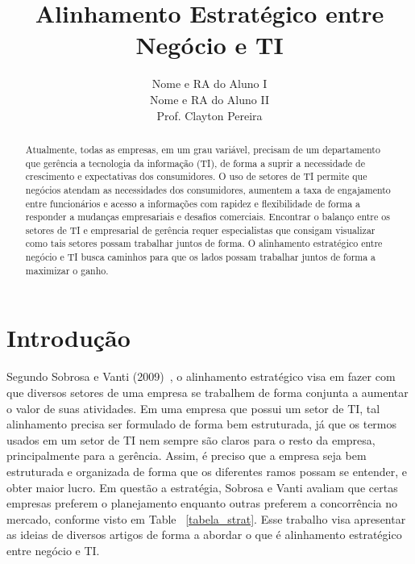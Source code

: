 \documentclass[review]{elsarticle}
\begin{document}
\begin{abstract}
\label{abs}

Atualmente, todas as empresas, em um grau variável, precisam de um departamento que gerência a tecnologia da informação (TI), de forma a suprir a necessidade de crescimento e expectativas dos consumidores. O uso de setores de TI permite que negócios atendam as necessidades dos consumidores, aumentem a taxa de engajamento entre funcionários e acesso a informações com rapidez e flexibilidade de forma a responder a mudanças empresariais e desafios comerciais. Encontrar o balanço entre os setores de TI e empresarial de gerência requer especialistas que consigam visualizar como tais setores possam trabalhar juntos de forma. O alinhamento estratégico entre negócio e TI busca caminhos para que os lados possam trabalhar juntos de forma a maximizar o ganho.~\cite{Edmead2016,wikibit2018}


\end{abstract}

\title{Alinhamento Estratégico entre Negócio e TI}


\author{Nome e RA do Aluno I \\ Nome e RA do Aluno II \\ Prof. Clayton Pereira}%


\maketitle


\section{Introdução}
Segundo Sobrosa e Vanti (2009)~\cite{Sobrosa2009}, o alinhamento estratégico visa em fazer com que diversos setores de uma empresa se trabalhem de forma conjunta a aumentar o valor de suas atividades. Em uma empresa que possui um setor de TI, tal alinhamento precisa ser formulado de forma bem estruturada, já que os termos usados em um setor de TI nem sempre são claros para o resto da empresa, principalmente para a gerência. Assim, é preciso que a empresa seja bem estruturada e organizada de forma que os diferentes ramos possam se entender, e obter maior lucro. Em questão a estratégia, Sobrosa e Vanti avaliam que certas empresas preferem o planejamento enquanto outras preferem a concorrência no mercado, conforme visto em Table ~\ref{tabela_strat}. Esse trabalho visa apresentar as ideias de diversos artigos de forma a abordar o que é alinhamento estratégico entre negócio e TI.
\end{document}

